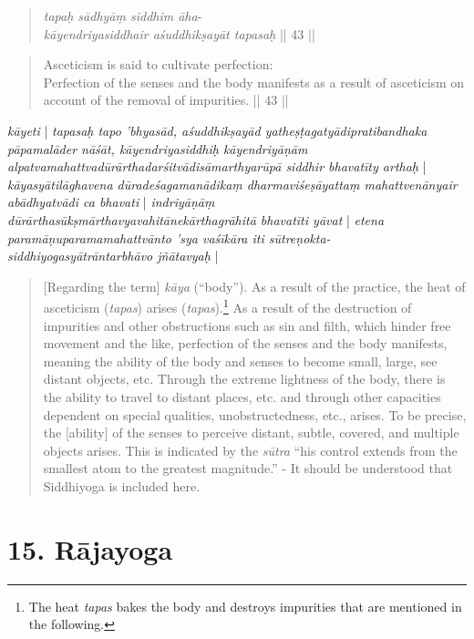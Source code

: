 \begin{quote}
\textit{tapaḥ sādhyāṃ siddhim āha}- \\
\textit{kāyendriyasiddhair aśuddhikṣayāt tapasaḥ} || 43 ||
\end{quote}
\begin{quote}
  Asceticism is said to cultivate perfection:\\
  Perfection of the senses and the body manifests as a result of asceticism on account of the removal of impurities. || 43 ||
\end{quote}
\textit{kāyeti} | \textit{tapasaḥ tapo 'bhyasād, aśuddhikṣayād yatheṣṭagatyādipratibandhaka pāpamalāder nāśāt, kāyendriyasiddhiḥ kāyendriyāṇām alpatvamahattvadūrārthadarśitvādisāmarthyarūpā siddhir bhavatīty arthaḥ} | \textit{kāyasyātilāghavena dūradeśagamanādikaṃ dharmaviśeṣāyattaṃ mahattvenānyair abādhyatvādi ca bhavati} | \textit{indriyāṇāṃ dūrārthasūkṣmārthavyavahitānekārthagrāhitā bhavatīti yāvat} | \textit{etena paramāṇuparamamahattvānto 'sya vaśīkāra iti sūtreṇokta- siddhiyogasyātrāntarbhāvo jñātavyaḥ} |
\begin{quote}
[Regarding the term] \textit{kāya} (``body''). As a result of the practice, the heat of asceticism (\textit{tapas}) arises (\textit{tapas}).\footnote{The heat \textit{tapas} bakes the body and destroys impurities that are mentioned in the following.} As a result of the destruction of impurities and other obstructions such as sin and filth, which hinder free movement and the like, perfection of the senses and the body manifests, meaning the ability of the body and senses to become small, large, see distant objects, etc. Through the extreme lightness of the body, there is the ability to travel to distant places, etc. and through other capacities dependent on special qualities, unobstructedness, etc., arises. To be precise, the [ability] of the senses to perceive distant, subtle, covered, and multiple objects arises. This is indicated by the \textit{sūtra} ``his control extends from the smallest atom to the greatest magnitude.'' - It should be understood that Siddhiyoga is included here. 
\end{quote}

\section{15. Rājayoga}
\label{rajayogaintro}

